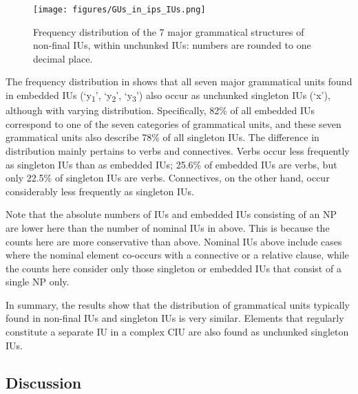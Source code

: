 \begin{figure}
	\texttt{[image: figures/GUs\_in\_ips\_IUs.png]}
	\caption{Frequency distribution of  the 7 major grammatical structures of non-final IUs, within unchunked IUs: numbers are rounded to one decimal place.}
	\label{Freq_GUs_in_ips_IUs}
\end{figure}


The frequency distribution in    shows that all seven major grammatical units found in embedded IUs (`y\textsubscript{1}', `y\textsubscript{2}', `y\textsubscript{3}') also occur as unchunked singleton IUs (`x'), although with varying distribution. Specifically, 82\% of all embedded IUs  correspond to one of the seven categories of grammatical units, and these seven grammatical units also describe 78\% of all singleton IUs. The difference in distribution mainly pertains to verbs and connectives. Verbs occur  less frequently as singleton IUs than as embedded IUs; 25.6\% of embedded IUs are verbs, but only 22.5\% of singleton IUs are verbs. Connectives, on the other hand, occur considerably less frequently as singleton IUs.

Note that the absolute numbers of IUs and embedded IUs consisting of an NP are lower here than the number of nominal IUs in   above. This is because the counts here are more conservative than above. Nominal IUs above include cases where the nominal element co-occurs with a connective or a relative clause, while the counts here consider only those singleton or embedded IUs that consist of a single NP only.

In summary, the results show that the distribution of grammatical units typically found in non-final IUs and singleton IUs is very similar. Elements that regularly constitute a separate IU in a complex CIU are also found as unchunked singleton IUs.






\subsection{Discussion}\label{sec:summary}



